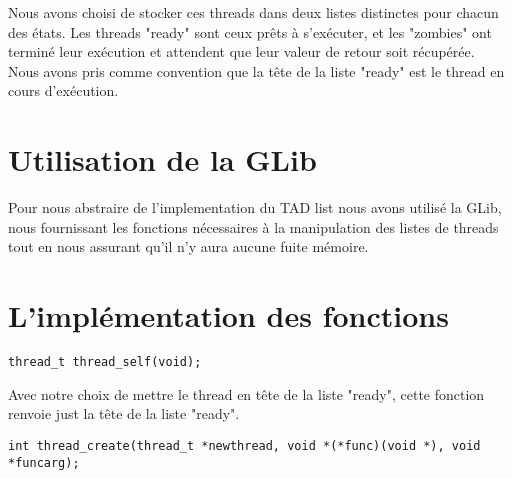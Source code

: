 \documentclass{article}
\begin{document}
Nous avons choisi de stocker ces threads dans deux listes distinctes
pour chacun des états. Les threads "ready" sont ceux prêts à
s'exécuter, et les "zombies" ont terminé leur exécution et attendent
que leur valeur de retour soit récupérée.\\
Nous avons pris comme convention que la tête de la liste "ready" est
le thread en cours d'exécution.

\section {Utilisation de la GLib}

Pour nous abstraire de l'implementation du TAD list nous avons utilisé
la GLib, nous fournissant les fonctions nécessaires à la manipulation
des listes de threads tout en nous assurant qu'il n'y aura aucune
fuite mémoire.

\section {L'implémentation des fonctions}

\begin{verbatim}
thread_t thread_self(void);
\end{verbatim}
Avec notre choix de mettre le thread en tête de la liste "ready", 
cette fonction renvoie just la tête de la liste "ready".
~~\\
\begin{verbatim}
int thread_create(thread_t *newthread, void *(*func)(void *), void *funcarg);
\end{verbatim}
\end{document}

